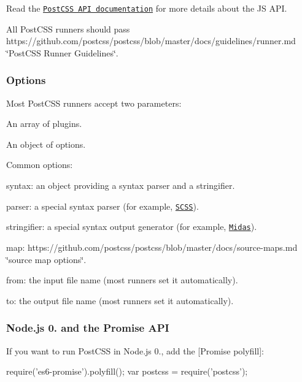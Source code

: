 Read the \href{http://api.postcss.org/postcss.html}{\tt Post\+C\+SS A\+PI documentation} for more details about the JS A\+PI.

All Post\+C\+SS runners should pass https\+://github.com/postcss/postcss/blob/master/docs/guidelines/runner.\+md \char`\"{}\+Post\+C\+S\+S Runner Guidelines\char`\"{}.

\subsubsection*{Options}

Most Post\+C\+SS runners accept two parameters\+:


\begin{DoxyItemize}
\item An array of plugins.
\item An object of options.
\end{DoxyItemize}

Common options\+:


\begin{DoxyItemize}
\item {\ttfamily syntax}\+: an object providing a syntax parser and a stringifier.
\item {\ttfamily parser}\+: a special syntax parser (for example, \href{https://github.com/postcss/postcss-scss}{\tt S\+C\+SS}).
\item {\ttfamily stringifier}\+: a special syntax output generator (for example, \href{https://github.com/ben-eb/midas}{\tt Midas}).
\item {\ttfamily map}\+: https\+://github.com/postcss/postcss/blob/master/docs/source-\/maps.\+md \char`\"{}source map options\char`\"{}.
\item {\ttfamily from}\+: the input file name (most runners set it automatically).
\item {\ttfamily to}\+: the output file name (most runners set it automatically).
\end{DoxyItemize}

\subsubsection*{Node.\+js 0. and the Promise A\+PI}

If you want to run Post\+C\+SS in Node.\+js 0., add the \mbox{[}Promise polyfill\mbox{]}\+:


\begin{DoxyCode}
require('es6-promise').polyfill();
var postcss = require('postcss');
\end{DoxyCode}


